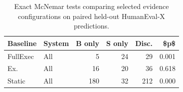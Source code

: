 \begin{table}[!htbp]
\centering
\scriptsize
\begin{tabular}{llrrrr}
\toprule
Baseline & System & B only & S only & Disc. & \$p\$ \\
\midrule
FullExec & All & 5 & 24 & 29 & 0.001 \\
Ex. & All & 16 & 20 & 36 & 0.618 \\
Static & All & 180 & 32 & 212 & 0.000 \\
\bottomrule
\end{tabular}
\vspace{0.5em}
\caption{Exact McNemar tests comparing selected evidence configurations on paired held-out HumanEval-X predictions.}
\label{tab:mcnemar}
\end{table}
